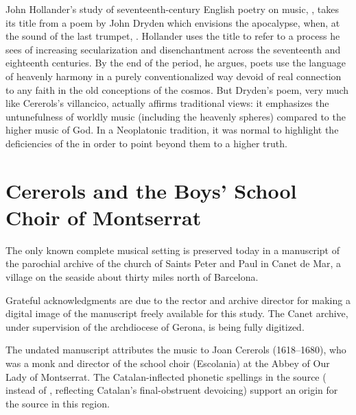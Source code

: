 John Hollander's study of seventeenth-century English poetry on music,
, takes its title from a poem by John Dryden
which envisions the apocalypse, when, at the sound of the last trumpet,
.%
    \Autocites
    {Hollander:Untuning}
    {Dryden:Alexander}
Hollander uses the title to refer to a process he sees of increasing
secularization and disenchantment across the seventeenth and eighteenth
centuries.
By the end of the period, he argues, poets use the language of heavenly harmony
in a purely conventionalized way devoid of real connection to any faith in the
old conceptions of the cosmos.
But Dryden's poem, very much like Cererols's villancico, actually affirms
traditional views: it emphasizes the untunefulness of worldly music (including
the heavenly spheres) compared to the higher music of God.
In a Neoplatonic tradition, it was normal to highlight the deficiencies of the
 in order to point beyond them to a higher
truth.

\section{Cererols and the Boys' School Choir of Montserrat}

The only known complete musical setting is preserved today in a manuscript of
the parochial archive of the church of Saints Peter and Paul in Canet de Mar, a
village on the seaside about thirty miles north of Barcelona.%
\begin{Footnote}
    Grateful acknowledgments are due to the rector and archive director for
    making a digital image of the manuscript freely available for this study.
    The Canet archive, under supervision of the archdiocese of Gerona, is being
    fully digitized.
\end{Footnote}
The undated manuscript attributes the music to Joan Cererols (1618--1680), who
was a monk and director of the school choir (Escolania) at the Abbey of Our Lady
of Montserrat.%
    \Autocite{Bonastre:CanetCatalog}
The Catalan-inflected phonetic spellings in the source ( instead
of , reflecting Catalan's final-obstruent devoicing) support an
origin for the source in this region.%
    \Autocite{Myers:CatalanPhonology}

